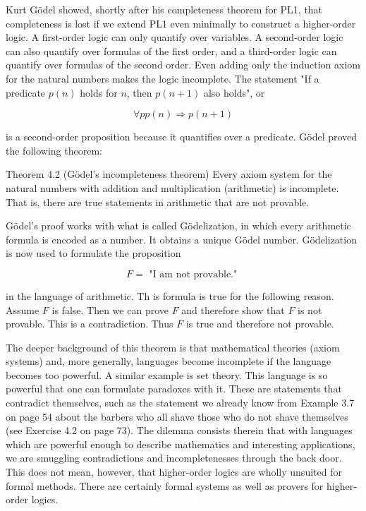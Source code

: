 \documentclass[10pt]{article}
\begin{document}
Kurt Gödel showed, shortly after his completeness theorem for PL1, that completeness is lost if we extend PL1 even minimally to construct a higher-order logic. A first-order logic can only quantify over variables. A second-order logic can also quantify over formulas of the first order, and a third-order logic can quantify over formulas of the second order. Even adding only the induction axiom for the natural numbers makes the logic incomplete. The statement "If a predicate $p(n)$ holds for $n$, then $p(n+1)$ also holds", or

$$
\forall p p(n) \Rightarrow p(n+1)
$$

is a second-order proposition because it quantifies over a predicate. Gödel proved the following theorem:

Theorem 4.2 (Gödel's incompleteness theorem) Every axiom system for the natural numbers with addition and multiplication (arithmetic) is incomplete. That is, there are true statements in arithmetic that are not provable.

Gödel's proof works with what is called Gödelization, in which every arithmetic formula is encoded as a number. It obtains a unique Gödel number. Gödelization is now used to formulate the proposition

$$
F=\text { "I am not provable." }
$$

in the language of arithmetic. Th
is formula is true for the following reason. Assume $F$ is false. Then we can prove $F$ and therefore show that $F$ is not provable. This is a contradiction. Thus $F$ is true and therefore not provable.

The deeper background of this theorem is that mathematical theories (axiom systems) and, more generally, languages become incomplete if the language becomes too powerful. A similar example is set theory. This language is so powerful that one can formulate paradoxes with it. These are statements that contradict themselves, such as the statement we already know from Example 3.7 on page 54 about the barbers who all shave those who do not shave themselves (see Exercise 4.2 on page 73). The dilemma consists therein that with languages which are powerful enough to describe mathematics and interesting applications, we are smuggling contradictions and incompletenesses through the back door. This does not mean, however, that higher-order logics are wholly unsuited for formal methods. There are certainly formal systems as well as provers for higher-order logics.
\end{document}
